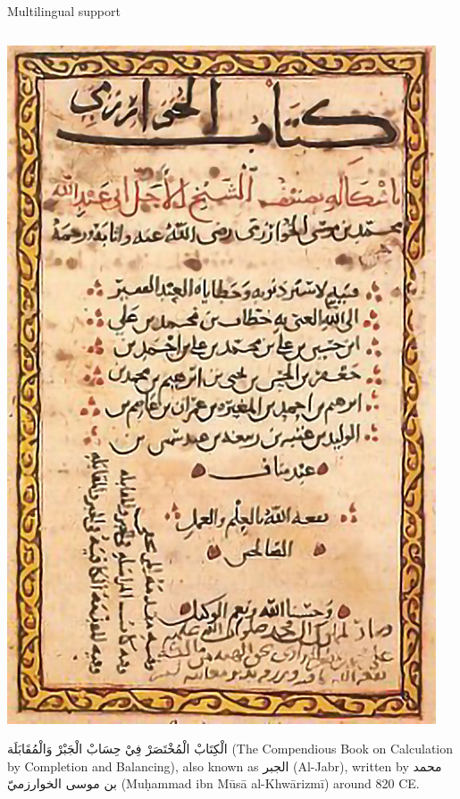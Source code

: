 \documentclass[,aspectratio=43]{beamer}
\begin{document}
\begin{frame}{Multilingual support}
\protect\hypertarget{multilingual-support}{}
\vspace{-2em}

\begin{columns}[T]
\begin{column}{0.48\textwidth}
\justifying

\begin{center}\includegraphics[width=1\linewidth,height=0.45\textheight]{figure/00-aljabr} \end{center}

\textarabic{
الْكِتَابْ الْمُخْتَصَرْ فِيْ حِسَابْ الْجَبْرْ وَالْمُقَابَلَة
} (The Compendious Book on Calculation by Completion and Balancing),
also known as \textarabic{الجبر} (Al-Jabr), written by \textarabic{
محمد بن موسى الخوارزميّ
} (Muḥammad ibn Mūsā al-Khwārizmī) around 820 CE.
\end{column}


\end{columns}
\end{frame}
\end{document}
